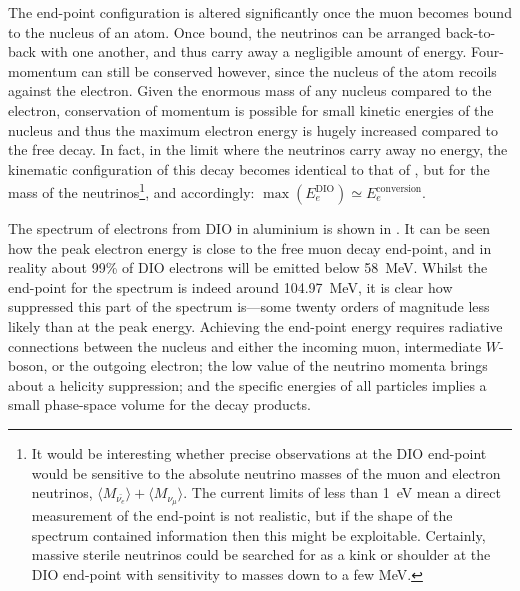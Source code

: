 The end-point configuration is altered significantly once the muon becomes bound to the nucleus of an atom.
Once bound, the neutrinos can be arranged back-to-back with one another, and thus carry away a negligible amount of energy.
Four-momentum can still be conserved however, since the nucleus of the atom recoils against the electron.  
Given the enormous mass of any nucleus compared to the electron, conservation of momentum is possible for small kinetic energies of the nucleus and thus the maximum electron energy is hugely increased compared to the free decay.
In fact, in the limit where the neutrinos carry away no energy, the kinematic configuration of this decay becomes identical to that of \mueconv, but for the mass of the neutrinos\footnote{
It would be interesting whether precise observations at the DIO end-point would be sensitive to the absolute neutrino masses of the muon and electron neutrinos, $\langle M_{\bar{\nu_{e}}}\rangle+\langle M_{\nu_{\mu}}\rangle$.
The current limits of less than 1~eV mean a direct measurement of the end-point is not realistic, but if the shape of the spectrum contained information then this might be exploitable.
Certainly, massive sterile neutrinos could be searched for as a kink or shoulder at the DIO end-point with sensitivity to masses down to a few MeV.
}, and accordingly: $\max(E_{e}^\textrm{DIO})\simeq{}E_{e}^\textrm{conversion}$.
\FigDecayInOrbitSpectrum

The spectrum of electrons from \ac{DIO} in aluminium is shown in .
It can be seen how the peak electron energy is close to the free muon decay end-point, and in reality about 99\% of \ac{DIO} electrons will be emitted below 58~MeV.
Whilst the end-point for the spectrum is indeed around 104.97~MeV, it is clear how suppressed this part of the spectrum is---some twenty orders of magnitude less likely than at the peak energy.
Achieving the end-point energy requires radiative connections between the nucleus and either the incoming muon, intermediate $W$-boson, or the outgoing electron; the low value of the neutrino momenta brings about a helicity suppression; and the specific energies of all particles implies a small phase-space volume for the decay products.

